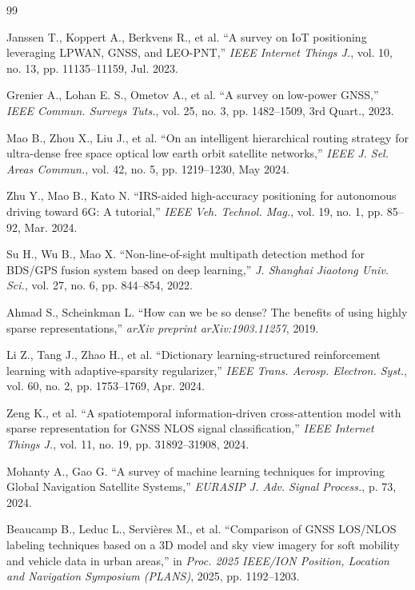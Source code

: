 \begin{thebibliography}{99}

 Janssen T., Koppert A., Berkvens R., et al. ``A survey on IoT positioning leveraging LPWAN, GNSS, and LEO-PNT,'' \textit{IEEE Internet Things J.}, vol. 10, no. 13, pp. 11135--11159, Jul. 2023.

 Grenier A., Lohan E. S., Ometov A., et al. ``A survey on low-power GNSS,'' \textit{IEEE Commun. Surveys Tuts.}, vol. 25, no. 3, pp. 1482--1509, 3rd Quart., 2023.

 Mao B., Zhou X., Liu J., et al. ``On an intelligent hierarchical routing strategy for ultra-dense free space optical low earth orbit satellite networks,'' \textit{IEEE J. Sel. Areas Commun.}, vol. 42, no. 5, pp. 1219--1230, May 2024.

 Zhu Y., Mao B., Kato N. ``IRS-aided high-accuracy positioning for autonomous driving toward 6G: A tutorial,'' \textit{IEEE Veh. Technol. Mag.}, vol. 19, no. 1, pp. 85--92, Mar. 2024.

 Su H., Wu B., Mao X. ``Non-line-of-sight multipath detection method for BDS/GPS fusion system based on deep learning,'' \textit{J. Shanghai Jiaotong Univ. Sci.}, vol. 27, no. 6, pp. 844--854, 2022.

 Ahmad S., Scheinkman L. ``How can we be so dense? The benefits of using highly sparse representations,'' \textit{arXiv preprint arXiv:1903.11257}, 2019.

 Li Z., Tang J., Zhao H., et al. ``Dictionary learning-structured reinforcement learning with adaptive-sparsity regularizer,'' \textit{IEEE Trans. Aerosp. Electron. Syst.}, vol. 60, no. 2, pp. 1753--1769, Apr. 2024.

 Zeng K., et al. ``A spatiotemporal information-driven cross-attention model with sparse representation for GNSS NLOS signal classification,'' \textit{IEEE Internet Things J.}, vol. 11, no. 19, pp. 31892--31908, 2024.

 Mohanty A., Gao G. ``A survey of machine learning techniques for improving Global Navigation Satellite Systems,'' \textit{EURASIP J. Adv. Signal Process.}, p. 73, 2024.

 Beaucamp B., Leduc L., Servi\`eres M., et al. ``Comparison of GNSS LOS/NLOS labeling techniques based on a 3D model and sky view imagery for soft mobility and vehicle data in urban areas,'' in \textit{Proc. 2025 IEEE/ION Position, Location and Navigation Symposium (PLANS)}, 2025, pp. 1192--1203.


\end{thebibliography}
